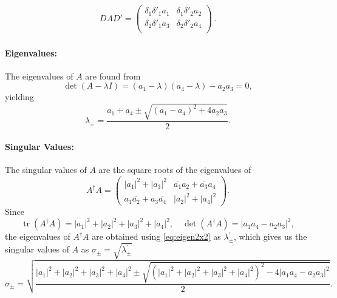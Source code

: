 \documentclass[11pt,a4paper]{article}
\begin{document}
\begin{eqnarray}
DAD'=\left(
\begin{array}{cc}
 \delta_1\delta'_{1}a_1 & \delta_1\delta'_{2}a_2 \\
 \delta_2\delta'_{1}a_3 & \delta_2\delta'_{2}a_4 \\
\end{array}\right)\,.\label{eq:DADp}
\end{eqnarray}
\paragraph{Eigenvalues:} The eigenvalues of \(A\) are found from
\begin{equation}
\det(A-\lambda I)= (a_1-\lambda)(a_4-\lambda)-a_2a_3=0,
\end{equation}
yielding
\begin{equation}\label{eq:eigen2x2}
\lambda_{\pm} = \frac{a_1+a_4\pm\sqrt{(a_1-a_4)^2+4a_2a_3}}{2}.
\end{equation}
\paragraph{Singular Values:} The singular values of  $A$ are the square roots of the eigenvalues of
\begin{equation}
A^\dagger A = \begin{pmatrix}
|a_1|^2 + |a_3|^2 & \overline{a_1}a_2 + \overline{a_3}a_4 \\
a_1\overline{a_2} + a_3\overline{a_4} & |a_2|^2 + |a_4|^2
\end{pmatrix}.
\end{equation}
Since
\begin{equation}
\operatorname{tr}(A^\dagger A) = |a_1|^2 + |a_2|^2 + |a_3|^2 + |a_4|^2, \quad \det(A^\dagger A) = |a_1a_4 - a_2a_3|^2,
\end{equation}
the eigenvalues of \(A^\dagger A\) are obtained using \cref{eq:eigen2x2} as \(\lambda^\prime_{\pm}\), which gives us the singular values of \(A\) as \(\sigma_\pm=\sqrt{\lambda^\prime_{\pm}}\)
\begin{equation}\label{eq:singularvalues2x2}
\sigma_{\pm} = \sqrt{\frac{|a_1|^2 + |a_2|^2 + |a_3|^2 + |a_4|^2 \pm \sqrt{(|a_1|^2 + |a_2|^2 + |a_3|^2 + |a_4|^2)^2 - 4|a_1a_4 - a_2a_3|^2}}{2}}.
\end{equation}
\end{document}
